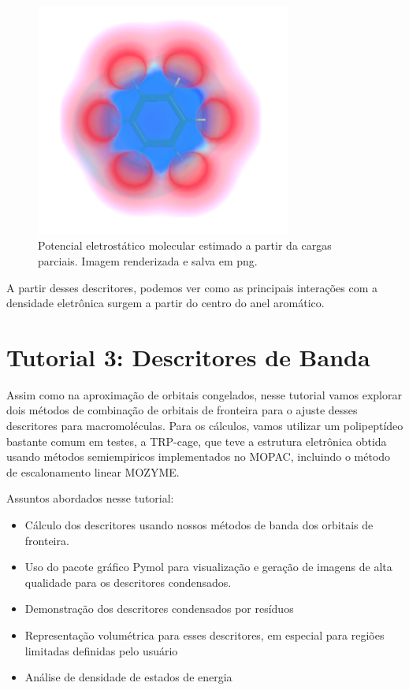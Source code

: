 \documentclass[a4paper,11pt]{refart}
\begin{document}
\hspace*{-\leftmarginwidth}
\begin{minipage}{\fullwidth}
	\begin{figure}[H]
		\begin{center}
			\includegraphics[width=3.3in]{images/tut2_img12}
			\caption{Potencial eletrostático molecular estimado a partir da cargas parciais. Imagem renderizada e salva em png.}
			\label{fig_tut2_11}
		\end{center}
	\end{figure}
\end{minipage}

A partir desses descritores, podemos ver como as principais interações com a densidade eletrônica surgem a partir do centro do anel aromático. 

\newpage
\section{Tutorial 3: Descritores de Banda}

Assim como na aproximação de orbitais congelados, nesse tutorial vamos explorar dois métodos de combinação de orbitais de fronteira para o ajuste desses descritores para macromoléculas. Para os cálculos, vamos utilizar um polipeptídeo bastante comum em testes, a TRP-cage, que teve a estrutura eletrônica obtida usando métodos semiempiricos implementados no MOPAC, incluindo o método de escalonamento linear MOZYME.

Assuntos abordados nesse tutorial:

\begin{itemize}
	\item Cálculo dos descritores usando nossos métodos de banda dos orbitais de fronteira.
	\item Uso do pacote gráfico Pymol para visualização e geração de imagens de alta qualidade para os descritores condensados. 
	\item Demonstração dos descritores condensados por resíduos
	\item Representação volumétrica para esses descritores, em especial para regiões limitadas definidas pelo usuário
	\item Análise de densidade de estados de energia
\end{itemize}
\end{document}

